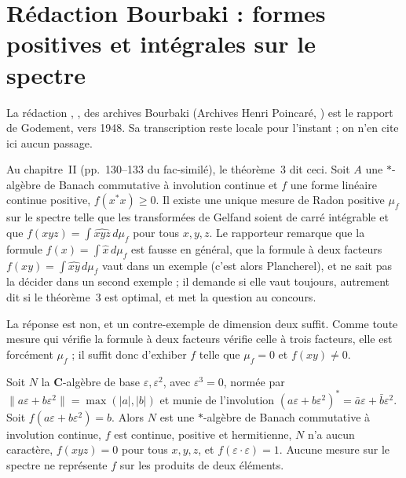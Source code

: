 \section[Rédaction Bourbaki \redac{089} : la question mise au concours]{Rédaction Bourbaki  : formes positives et intégrales sur le spectre\protect\piste\protect{}}\label{sec:bourbaki-089}

La rédaction , , des archives Bourbaki (Archives Henri Poincaré, ) est le rapport de Godement, vers 1948. Sa transcription reste locale pour l'instant ; on n'en cite ici aucun passage.

Au chapitre~II (pp.~130--133 du fac-similé), le théorème~3 dit ceci. Soit $A$ une $*$-algèbre de Banach commutative à involution continue et $f$ une forme linéaire continue positive, $f(x^*x) \ge 0$. Il existe une unique mesure de Radon positive $\mu_f$ sur le spectre telle que les transformées de Gelfand soient de carré intégrable et que $f(xyz) = \int \widehat{xyz}\, d\mu_f$ pour tous $x, y, z$. Le rapporteur remarque que la formule $f(x) = \int \hat x\, d\mu_f$ est fausse en général, que la formule à deux facteurs $f(xy) = \int \widehat{xy}\, d\mu_f$ vaut dans un exemple (c'est alors Plancherel), et ne sait pas la décider dans un second exemple ; il demande si elle vaut toujours, autrement dit si le théorème~3 est optimal, et met la question au concours.

La réponse est non, et un contre-exemple de dimension deux suffit. Comme toute mesure qui vérifie la formule à deux facteurs vérifie celle à trois facteurs, elle est forcément $\mu_f$ ; il suffit donc d'exhiber $f$ telle que $\mu_f = 0$ et $f(xy) \ne 0$.

\begin{encadre}
\begin{contrexemple}\mbox{}
Soit $N$ la $\mathbf C$-algèbre de base $\varepsilon, \varepsilon^2$, avec $\varepsilon^3 = 0$, normée par $\|a\varepsilon + b\varepsilon^2\| = \max(|a|, |b|)$ et munie de l'involution $(a\varepsilon + b\varepsilon^2)^* = \bar a \varepsilon + \bar b \varepsilon^2$. Soit $f(a\varepsilon + b\varepsilon^2) = b$. Alors $N$ est une $*$-algèbre de Banach commutative à involution continue, $f$ est continue, positive et hermitienne, $N$ n'a aucun caractère, $f(xyz) = 0$ pour tous $x, y, z$, et $f(\varepsilon \cdot \varepsilon) = 1$. Aucune mesure sur le spectre ne représente $f$ sur les produits de deux éléments.
\end{contrexemple}
\end{encadre}


